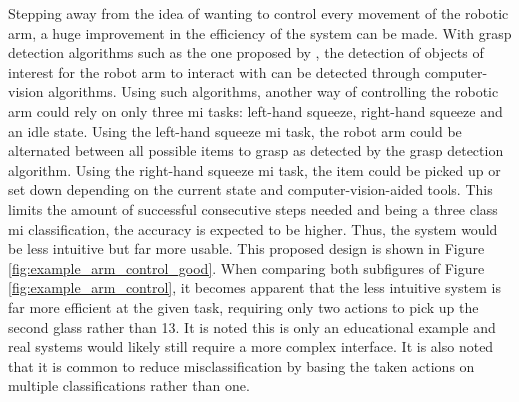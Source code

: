 Stepping away from the idea of wanting to control every movement of the robotic arm, a huge improvement in the efficiency of the system can be made.
With grasp detection algorithms such as the one proposed by \citet{graspnet}, the detection of objects of interest for the robot arm to interact with can be detected through computer-vision algorithms.
Using such algorithms, another way of controlling the robotic arm could rely on only three \gls{mi} tasks: left-hand squeeze, right-hand squeeze and an idle state.
Using the left-hand squeeze \gls{mi} task, the robot arm could be alternated between all possible items to grasp as detected by the grasp detection algorithm. 
Using the right-hand squeeze \gls{mi} task, the item could be picked up or set down depending on the current state and computer-vision-aided tools.
This limits the amount of successful consecutive steps needed and being a three class \gls{mi} classification, the accuracy is expected to be higher.
Thus, the system would be less intuitive but far more usable.
This proposed design is shown in Figure \ref{fig:example_arm_control_good}.
When comparing both subfigures of Figure \ref{fig:example_arm_control}, it becomes apparent that the less intuitive system is far more efficient at the given task, requiring only two actions to pick up the second glass rather than 13.
It is noted this is only an educational example and real systems would likely still require a more complex interface.
It is also noted that it is common to reduce misclassification by basing the taken actions on multiple classifications rather than one.

